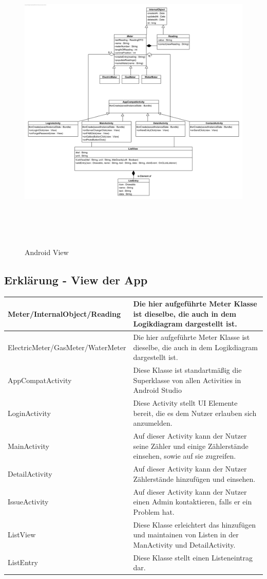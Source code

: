 \begin{figure}[H]
\hspace{-1cm}
\includegraphics[height=14cm]{img/diagrams/Android-Class-Diagram-View}\\
\caption{Android View}
\end{figure}

\subsection*{Erklärung - View der App}
\begin{tabularx}{15cm}{XX}
	\hline
	Meter/InternalObject/Reading & Die hier aufgeführte Meter Klasse ist dieselbe, die auch in dem Logikdiagram dargestellt ist. \\ \hline
	ElectricMeter/GasMeter/WaterMeter & Die hier aufgeführte Meter Klasse ist dieselbe, die auch in dem Logikdiagram dargestellt ist. \\ \hline
	AppCompatActivity & Diese Klasse ist standartmäßig die Superklasse von allen Activities in Android Studio \\ \hline
	LoginActivity & Diese Activity stellt UI Elemente bereit, die es dem Nutzer erlauben sich anzumelden. \\ \hline
	MainActivity & Auf dieser Activity kann der Nutzer seine Zähler und einige Zählerstände einsehen, sowie auf sie zugreifen. \\ \hline
	DetailActivity & Auf dieser Activity kann der Nutzer Zählerstände hinzufügen und einsehen. \\ \hline
	IssueActivity & Auf dieser Activity kann der Nutzer einen Admin kontaktieren, falls er ein Problem hat. \\ \hline
	ListView & Diese Klasse erleichtert das hinzufügen und maintainen von Listen in der ManActivity und DetailActivity. \\ \hline
	ListEntry & Diese Klasse stellt einen Listeneintrag dar. 
\end{tabularx}
